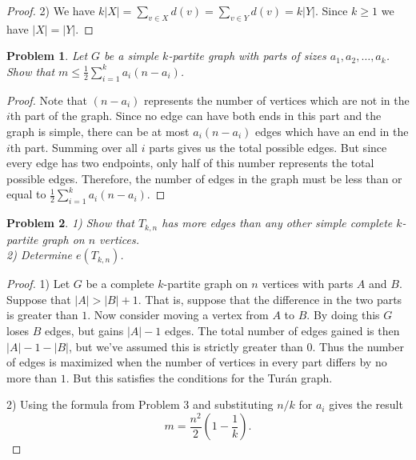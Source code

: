 \documentclass{article}
\newtheorem{problem}{Problem}
\begin{document}
\begin{flushleft}
\begin{proof}
2) We have $k|X| = \sum_{v \in X} d(v) = \sum_{v \in Y} d(v) = k|Y|$. Since $k \geq 1$ we have $|X| = |Y|$.
\end{proof}

\begin{problem}
Let $G$ be a simple $k$-partite graph with parts of sizes $a_1, a_2, \dots , a_k$. Show that $m \leq \frac{1}{2} \sum_{i=1}^{k} a_i(n-a_i)$.
\end{problem}
\begin{proof}
Note that $(n-a_i)$ represents the number of vertices which are not in the $i$th part of the graph. Since no edge can have both ends in this part and the graph is simple, there can be at most $a_i(n-a_i)$ edges which have an end in the $i$th part. Summing over all $i$ parts gives us the total possible edges. But since every edge has two endpoints, only half of this number represents the total possible edges. Therefore, the number of edges in the graph must be less than or equal to $\frac{1}{2} \sum_{i=1}^{k} a_i(n-a_i)$.
\end{proof}

\begin{problem}
1) Show that $T_{k,n}$ has more edges than any other simple complete $k$-partite graph on $n$ vertices.\\
2) Determine $e(T_{k,n})$.
\end{problem}
\begin{proof}
1) Let $G$ be a complete $k$-partite graph on $n$ vertices with parts $A$ and $B$. Suppose that $|A| > |B| + 1$. That is, suppose that the difference in the two parts is greater than $1$. Now consider moving a vertex from $A$ to $B$. By doing this $G$ loses $B$ edges, but gains $|A| - 1$ edges. The total number of edges gained is then $|A| - 1 - |B|$, but we've assumed this is strictly greater than $0$. Thus the number of edges is maximized when the number of vertices in every part differs by no more than $1$. But this satisfies the conditions for the Tur\'{a}n graph.\newline

2) Using the formula from Problem 3 and substituting $n/k$ for $a_i$ gives the result
\[
m = \frac{n^2}{2} \left ( 1-\frac{1}{k} \right ).
\]
\end{proof}


\end{flushleft}
\end{document}
